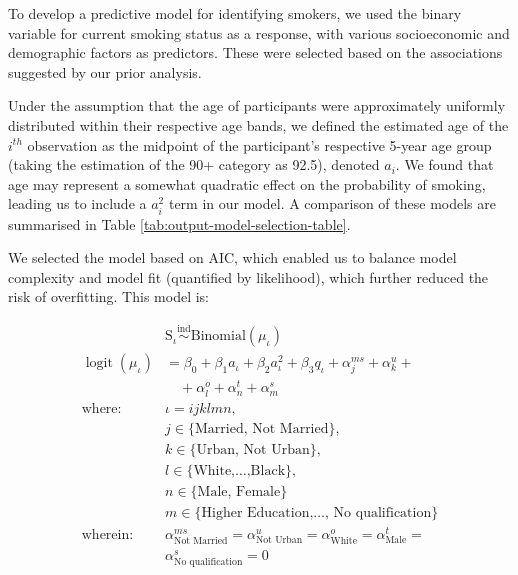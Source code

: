 \documentclass[
  11pt,
  twocolumn]{article}
\begin{document}
To develop a predictive model for identifying smokers, we used the
binary variable for current smoking status as a response, with various
socioeconomic and demographic factors as predictors. These were selected
based on the associations suggested by our prior analysis.

Under the assumption that the age of participants were approximately
uniformly distributed within their respective age bands, we defined the
estimated age of the \(i^{th}\) observation as the midpoint of the
participant's respective 5-year age group (taking the estimation of the
90+ category as 92.5), denoted \(a_i\). We found that age may represent
a somewhat quadratic effect on the probability of smoking, leading us to
include a \(a_i^2\) term in our model. A comparison of these models are
summarised in Table \ref{tab:output-model-selection-table}.

We selected the model based on AIC, which enabled us to balance model
complexity and model fit (quantified by likelihood), which further
reduced the risk of overfitting. This model is:

\begin{align*}
&\text{S}_{\iota} \overset{\text{ind}}{\sim} \text{Binomial}(\mu_{\iota}) \\
\mathop{\mathrm{logit}}(\mu_{\iota}) &= \beta_0 + \beta_1a_{\iota} + \beta_2a_{\iota}^2 + \beta_3q_{\iota} + \alpha^{ms}_j + \alpha^{u}_k + \\
&\quad + \alpha^{o}_l + \alpha^{t}_n + \alpha^{s}_m \\
\text{where: } & \iota = ijklmn, \\
&j \in \{\text{Married, Not Married}\}, \\
&k \in \{\text{Urban, Not Urban}\}, \\
&l \in \{\text{White,}\ldots\text{,Black}\}, \\
&n \in \{\text{Male, Female\}}\ \\
&m \in \{\text{Higher Education,}\ldots\text{, No qualification}\} \\
\text{wherein:} \ &\alpha^{ms}_{\text{Not Married}}=\alpha^u_{\text{Not Urban}} = 
\alpha^{o}_{\text{White}}= \alpha^{t}_{\text{Male}}= \\
&\alpha^{s}_{\text{No qualification}} = 0
\end{align*}
\end{document}
